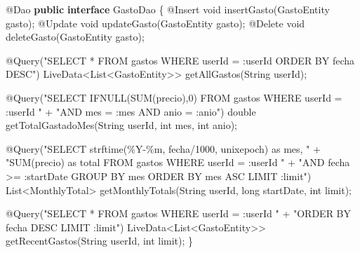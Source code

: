 \documentclass[
  spanish,
  11pt,
  paper=a4,
  ,captions=tableheading
]{scrartcl}
\newenvironment{Shaded}{}{}
\newcommand{\AttributeTok}[1]{\textcolor[rgb]{0.49,0.56,0.16}{#1}}
\newcommand{\BuiltInTok}[1]{\textcolor[rgb]{0.00,0.50,0.00}{#1}}
\newcommand{\DataTypeTok}[1]{\textcolor[rgb]{0.56,0.13,0.00}{#1}}
\newcommand{\FunctionTok}[1]{\textcolor[rgb]{0.02,0.16,0.49}{#1}}
\newcommand{\KeywordTok}[1]{\textcolor[rgb]{0.00,0.44,0.13}{\textbf{#1}}}
\newcommand{\NormalTok}[1]{#1}
\newcommand{\OperatorTok}[1]{\textcolor[rgb]{0.40,0.40,0.40}{#1}}
\newcommand{\StringTok}[1]{\textcolor[rgb]{0.25,0.44,0.63}{#1}}
\begin{document}
\begin{Shaded}
\begin{Highlighting}[]
\AttributeTok{@Dao}
\KeywordTok{public} \KeywordTok{interface}\NormalTok{ GastoDao }\OperatorTok{\{}
    \AttributeTok{@Insert} \DataTypeTok{void} \FunctionTok{insertGasto}\OperatorTok{(}\NormalTok{GastoEntity gasto}\OperatorTok{);}
    \AttributeTok{@Update} \DataTypeTok{void} \FunctionTok{updateGasto}\OperatorTok{(}\NormalTok{GastoEntity gasto}\OperatorTok{);}
    \AttributeTok{@Delete} \DataTypeTok{void} \FunctionTok{deleteGasto}\OperatorTok{(}\NormalTok{GastoEntity gasto}\OperatorTok{);}

    \AttributeTok{@Query}\OperatorTok{(}\StringTok{"SELECT * FROM gastos WHERE userId = :userId ORDER BY fecha DESC"}\OperatorTok{)}
\NormalTok{    LiveData}\OperatorTok{\textless{}}\BuiltInTok{List}\OperatorTok{\textless{}}\NormalTok{GastoEntity}\OperatorTok{\textgreater{}\textgreater{}} \FunctionTok{getAllGastos}\OperatorTok{(}\BuiltInTok{String}\NormalTok{ userId}\OperatorTok{);}

    \AttributeTok{@Query}\OperatorTok{(}\StringTok{"SELECT IFNULL(SUM(precio),0) FROM gastos WHERE userId = :userId "} \OperatorTok{+}
           \StringTok{"AND mes = :mes AND anio = :anio"}\OperatorTok{)}
    \DataTypeTok{double} \FunctionTok{getTotalGastadoMes}\OperatorTok{(}\BuiltInTok{String}\NormalTok{ userId}\OperatorTok{,} \DataTypeTok{int}\NormalTok{ mes}\OperatorTok{,} \DataTypeTok{int}\NormalTok{ anio}\OperatorTok{);}

    \AttributeTok{@Query}\OperatorTok{(}\StringTok{"SELECT strftime(\textquotesingle{}\%Y{-}\%m\textquotesingle{}, fecha/1000, \textquotesingle{}unixepoch\textquotesingle{}) as mes, "} \OperatorTok{+}
           \StringTok{"SUM(precio) as total FROM gastos WHERE userId = :userId "} \OperatorTok{+}
           \StringTok{"AND fecha \textgreater{}= :startDate GROUP BY mes ORDER BY mes ASC LIMIT :limit"}\OperatorTok{)}
    \BuiltInTok{List}\OperatorTok{\textless{}}\NormalTok{MonthlyTotal}\OperatorTok{\textgreater{}} \FunctionTok{getMonthlyTotals}\OperatorTok{(}\BuiltInTok{String}\NormalTok{ userId}\OperatorTok{,} \DataTypeTok{long}\NormalTok{ startDate}\OperatorTok{,} \DataTypeTok{int}\NormalTok{ limit}\OperatorTok{);}

    \AttributeTok{@Query}\OperatorTok{(}\StringTok{"SELECT * FROM gastos WHERE userId = :userId "} \OperatorTok{+}
           \StringTok{"ORDER BY fecha DESC LIMIT :limit"}\OperatorTok{)}
\NormalTok{    LiveData}\OperatorTok{\textless{}}\BuiltInTok{List}\OperatorTok{\textless{}}\NormalTok{GastoEntity}\OperatorTok{\textgreater{}\textgreater{}} \FunctionTok{getRecentGastos}\OperatorTok{(}\BuiltInTok{String}\NormalTok{ userId}\OperatorTok{,} \DataTypeTok{int}\NormalTok{ limit}\OperatorTok{);}
\OperatorTok{\}}
\end{Highlighting}
\end{Shaded}
\end{document}
